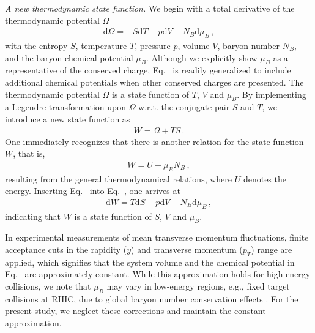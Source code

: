 \documentclass[aps,twocolumn,prd,superscriptaddress,nofootinbib,floatfix]{revtex4-2} %
\begin{document}
\textit{A new thermodynamic state function.} \label{sec:Wfunction}  We begin with a total derivative of the thermodynamic potential $\Omega$
\begin{align}
    \mathrm{d} \Omega=-S \mathrm{d} T-p \mathrm{d}V-N_B \mathrm{d} \mu_B\,, \label{eq:dOmega}
\end{align}
with the entropy $S$, temperature $T$, pressure $p$, volume $V$, baryon number $N_B$, and the baryon chemical potential $\mu_B$. Although we explicitly show $\mu_B$ as a representative of the conserved charge, Eq.~ is readily generalized to include additional chemical potentials when other conserved charges are presented. The thermodynamic potential $\Omega$ is a state function of $T$, $V$ and $\mu_B$. By implementing a Legendre transformation upon $\Omega$ w.r.t. the conjugate pair $S$ and $T$, we introduce a new state function as
\begin{align}
    W=\Omega+TS\,. \label{eq:W-def}
\end{align}
One immediately recognizes that there is another relation for the state function $W$, that is,
\begin{align}
    W=U-\mu_B N_B\,,\label{}
\end{align}
resulting from the general thermodynamical relations, where $U$ denotes the energy. Inserting Eq.~ into Eq.~, one arrives at
\begin{align}
    \mathrm{d} W=T\mathrm{d} S-p \mathrm{d}V-N_B \mathrm{d} \mu_B\,, \label{eq:dW}
\end{align}
indicating that $W$ is a state function of $S$, $V$ and $\mu_B$.

In experimental measurements of mean transverse momentum fluctuations, finite acceptance cuts in the rapidity ($y$) and transverse momentum ($p_{T}$) range are applied, which signifies that the system volume and the chemical potential in Eq.~ are approximately constant. While this approximation holds for high-energy collisions, we note that $\mu_B$ may vary in low-energy regions, e.g., fixed target collisions at RHIC, due to global baryon number conservation effects \cite{Braun-Munzinger:2020jbk, Vovchenko:2021kxx, Fu:2023lcm}. For the present study, we neglect these corrections and maintain the constant approximation. 
\end{document}
